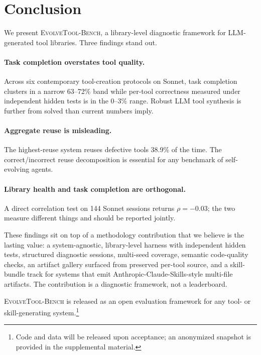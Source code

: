 \documentclass[sigconf,anonymous,review,natbib=false]{acmart}
\begin{document}
\section{Conclusion}

We present \textsc{EvolveTool-Bench}, a library-level diagnostic framework for LLM-generated tool libraries. Three findings stand out.

\paragraph{Task completion overstates tool quality.} Across six contemporary tool-creation protocols on Sonnet, task completion clusters in a narrow 63--72\% band while per-tool correctness measured under independent hidden tests is in the 0--3\% range. Robust LLM tool synthesis is further from solved than current numbers imply.

\paragraph{Aggregate reuse is misleading.} The highest-reuse system reuses defective tools 38.9\% of the time. The correct/incorrect reuse decomposition is essential for any benchmark of self-evolving agents.

\paragraph{Library health and task completion are orthogonal.} A direct correlation test on 144 Sonnet sessions returns $\rho = -0.03$; the two measure different things and should be reported jointly.

These findings sit on top of a methodology contribution that we believe is the lasting value: a system-agnostic, library-level harness with independent hidden tests, structured diagnostic sessions, multi-seed coverage, semantic code-quality checks, an artifact gallery surfaced from preserved per-tool source, and a skill-bundle track for systems that emit Anthropic-Claude-Skills-style multi-file artifacts. The contribution is a diagnostic framework, not a leaderboard.

\textsc{EvolveTool-Bench} is released as an open evaluation framework for any tool- or skill-generating system.\footnote{Code and data will be released upon acceptance; an anonymized snapshot is provided in the supplemental material.}





\end{document}
